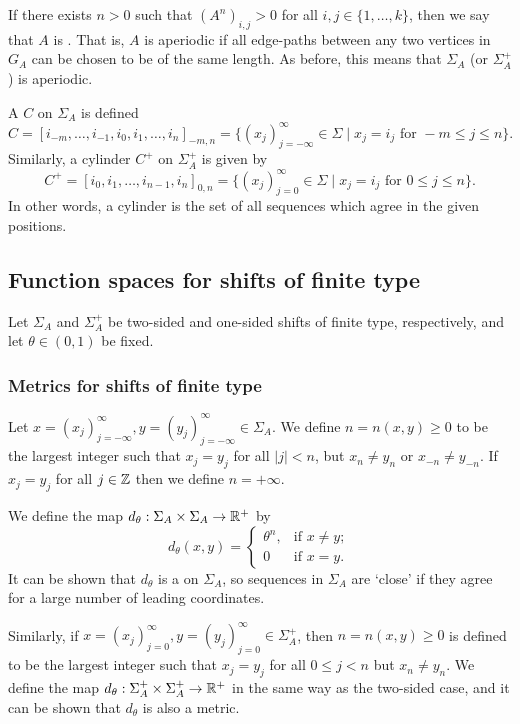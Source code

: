 If there exists $n > 0$ such that $(A^n)_{i, j} > 0$ for all $i, j \in \{1, \dots, k\}$, then we say that $A$ is . That is, $A$ is aperiodic if all edge-paths between any two vertices in $G_A$ can be chosen to be of the same length. As before, this means that $\Sigma_A$ (or $\Sigma_A^+$) is aperiodic.

A  $C$ on $\Sigma_A$ is defined
\[
	C = [i_{-m}, \dots, i_{-1}, i_0, i_1, \dots, i_n]_{-m, n} = \{(x_j)_{j = -\infty}^\infty \in \Sigma \mid x_j = i_j \text{ for } -m \leq j \leq n\}.
\]
Similarly, a cylinder $C^+$ on $\Sigma_A^+$ is given by
\[
	C^+ = [i_0, i_1, \dots, i_{n - 1}, i_n]_{0, n} = \{(x_j)_{j = 0}^\infty \in \Sigma \mid x_j = i_j \text{ for } 0 \leq j \leq n\}.
\]
In other words, a cylinder is the set of all sequences which agree in the given positions.

\subsection{Function spaces for shifts of finite type}
Let $\Sigma_A$ and $\Sigma_A^+$ be two-sided and one-sided shifts of finite type, respectively, and let $\theta \in (0, 1)$ be fixed.

\subsubsection{Metrics for shifts of finite type}
Let $x = (x_j)_{j = -\infty}^\infty, y = (y_j)_{j = -\infty}^\infty \in \Sigma_A$. We define $n = n(x, y) \geq 0$ to be the largest integer such that $x_j = y_j$ for all $|j| < n$, but $x_n \neq y_n$ or $x_{-n} \neq y_{-n}$. If $x_j = y_j$ for all $j \in \mathbb{Z}$ then we define $n = +\infty$.

We define the map $d_\theta : \Sigma_A \times \Sigma_A \to \mathbb{R}^+$ by
\[
	d_\theta(x, y) =
	\begin{cases}
		\theta^n, & \text{if } x \neq y; \\
		0 & \text{if } x = y.
	\end{cases}
\]
It can be shown that $d_\theta$ is a  on $\Sigma_A$, so sequences in $\Sigma_A$ are `close' if they agree for a large number of leading coordinates.

Similarly, if $x = (x_j)_{j = 0}^\infty, y = (y_j)_{j = 0}^\infty \in \Sigma_A^+$, then $n = n(x, y) \geq 0$ is defined to be the largest integer such that $x_j = y_j$ for all $0 \leq j < n$ but $x_n \neq y_n$. We define the map $d_\theta : \Sigma_A^+ \times \Sigma_A^+ \to \mathbb{R}^+$ in the same way as the two-sided case, and it can be shown that $d_\theta$ is also a metric.

